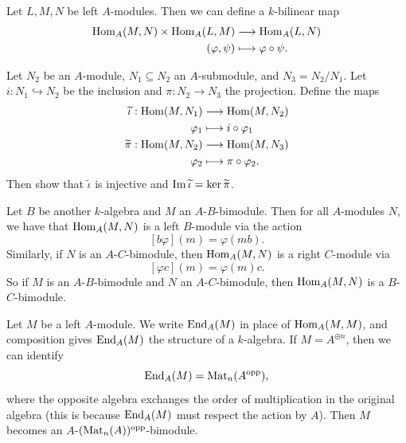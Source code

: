 \begin{remark}
  Let $L, M, N$ be left $A$-modules. Then
  we can define a $k$-bilinear map
  \begin{align*}
    \operatorname{Hom}_A(M, N) \times \operatorname{Hom}_A(L, M) &\longrightarrow \operatorname{Hom}_A(L, N) \\
    (\varphi, \psi) &\longmapsto \varphi \circ \psi.
  \end{align*}
\end{remark}

\begin{exercise}
  Let $N_2$ be an $A$-module,
  $N_1 \subseteq N_2$ an $A$-submodule,
  and $N_3 = N_2 / N_1$. Let
  $i : N_1 \hookrightarrow N_2$ be the
  inclusion and $\pi : N_2 \to N_3$ the
  projection. Define the maps
  \begin{align*}
    \widetilde{\iota} : \operatorname{Hom}(M, N_1) &\longrightarrow \operatorname{Hom}(M, N_2) \\
    \varphi_1 &\longmapsto i \circ \varphi_1 \\
    \widetilde{\pi} : \operatorname{Hom}(M, N_2) &\longrightarrow \operatorname{Hom}(M, N_3) \\
    \varphi_2 &\longmapsto \pi \circ \varphi_2.
  \end{align*}
  Then show that $\widetilde{\iota}$
  is injective and $\operatorname{Im} \widetilde{\iota} = \ker \widetilde{\pi}$.
\end{exercise}

\begin{remark}
  Let $B$ be another $k$-algebra and $M$ an
  $A$-$B$-bimodule. Then for all
  $A$-modules $N$, we have that
  $\operatorname{Hom}_A(M, N)$
  is a left $B$-module via the action
  \[
    [b \varphi](m) = \varphi(mb).
  \]
  Similarly, if $N$ is an
  $A$-$C$-bimodule, then
  $\operatorname{Hom}_A(M, N)$ is a right $C$-module
  via
  \[
    [\varphi c](m) = \varphi(m)c.
  \]
  So if $M$ is an $A$-$B$-bimodule
  and $N$ an $A$-$C$-bimodule,
  then $\operatorname{Hom}_A(M, N)$ is a $B$-$C$-bimodule.
\end{remark}

\begin{remark}
  Let $M$ be a left $A$-module.
  We write $\operatorname{End}_A(M)$ in place of
  $\operatorname{Hom}_A(M, M)$, and composition gives
  $\operatorname{End}_A(M)$ the structure of a
  $k$-algebra. If $M = A^{\oplus n}$,
  then we can identify
  \[
    \operatorname{End}_A(M) = \operatorname{Mat}_n(A^{\mathrm{opp}}),
  \]
  where the opposite algebra exchanges
  the order of multiplication in the
  original algebra (this is because
  $\operatorname{End}_A(M)$ must respect the action by
  $A$). Then
  $M$ becomes an
  $A$-$(\operatorname{Mat}_n(A))^{\mathrm{opp}}$-bimodule.
\end{remark}

